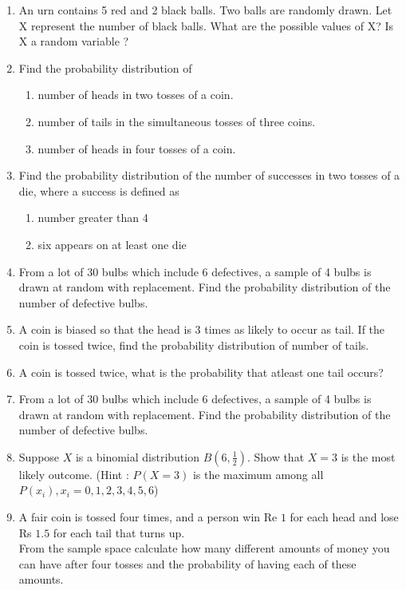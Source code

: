 \begin{enumerate}[label=\thesection.\arabic*,ref=\thesection.\theenumi]
\item An urn contains 5 red and 2 black balls. Two balls are randomly drawn. Let X
represent the number of black balls. What are the possible values of X? Is X a
random variable ? 
\item Find the probability distribution of
\begin{enumerate}
\item number of heads in two tosses of a coin.
\item number of tails in the simultaneous tosses of three coins.
\item number of heads in four tosses of a coin.
\end{enumerate}

\item Find the probability distribution of the number of successes in two tosses of a die,
where a success is defined as
\begin{enumerate}
\item number greater than 4
\item six appears on at least one die
\end{enumerate}
\item From a lot of 30 bulbs which include 6 defectives, a sample of 4 bulbs is drawn
at random with replacement. Find the probability distribution of the number of
defective bulbs.
\item A coin is biased so that the head is 3 times as likely to occur as tail. If the coin is
tossed twice, find the probability distribution of number of tails.
\item A coin is tossed twice, what is the probability that atleast one tail occurs?
\\
\solution

\item From a lot of 30 bulbs which include 6 defectives, a sample of 4 bulbs is drawn
at random with replacement. Find the probability distribution of the number of
defective bulbs.
 \item Suppose $X$ is a binomial distribution $B\left(6,\frac{1}{2}\right)$. Show that $X=3$ is the most likely outcome.
(Hint : $P(X=3)$ is the maximum among all $P(x_i),x_i=0,1,2,3,4,5,6$)

\item A fair coin is tossed four times, and a person win Re $1$ for each head and lose Rs $1.5$ for each tail that turns up.\\
From the sample space calculate how many different amounts of money you can have after four tosses and the probability of having each of these amounts.

\end{enumerate}

